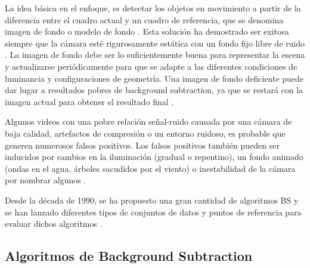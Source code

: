 La idea básica en el enfoque, es detectar los objetos en movimiento a partir de la diferencia entre el cuadro actual y un cuadro de referencia, que se denomina imagen de fondo o modelo de fondo \cite{DeepjoySarat}. Esta solución ha demostrado ser exitosa siempre que la cámara esté rigurosamente estática con un fondo fijo libre de ruido \cite{YannickPierreMarcBrunoHeleneChristophe}. La imagen de fondo debe ser lo suficientemente buena para representar la escena y actualizarse periódicamente para que se adapte a las diferentes condiciones de luminancia y configuraciones de geometría. Una imagen de fondo deficiente puede dar lugar a resultados pobres de background subtraction, ya que se restará con la imagen actual para obtener el resultado final \cite{DeepjoySarat}.

Algunos videos con una pobre relación señal-ruido causada por una cámara de baja calidad, artefactos de compresión o un entorno ruidoso, es probable que generen numerosos falsos positivos. Los falsos positivos también pueden ser inducidos por cambios en la iluminación (gradual o repentino), un fondo animado (ondas en el agua, árboles sacudidos por el viento) o inestabilidad de la cámara por nombrar algunos \cite{YannickPierreMarcBrunoHeleneChristophe}.

Desde la década de 1990, se ha propuesto una gran cantidad de algoritmos BS y se han lanzado diferentes tipos de conjuntos de datos y puntos de referencia para evaluar dichos algoritmos \cite{GuangleTaoJiandanPingWenwu}.

\subsection{Algoritmos de Background Subtraction}

